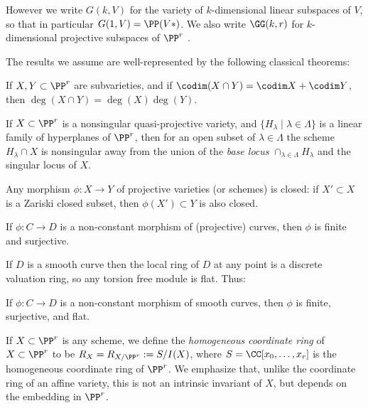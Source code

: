 However we write $G(k,V)$ for the variety of $k$-dimensional linear subspaces of $V$, so that in particular $G(1,V) = \PP(V*)$.
We also write $\GG(k,r)$ for $k$-dimensional
projective subspaces of $\PP^r$ .

The results we assume are
 well-represented by the following classical theorems:

\begin{theorem}
If $X,Y\subset \PP^r$ are subvarieties, and if $\codim(X\cap Y) = \codim X + \codim Y$,
then $\deg (X\cap Y) = \deg(X)\deg(Y)$.
\end{theorem}

\begin{theorem}\label{Bertini}
If $X\subset \PP^r$  is a nonsingular quasi-projective variety, and $\{H_\lambda \mid \lambda\in \Lambda\}$ is a linear family of hyperplanes of $\PP^r$, then for an open subset of $\lambda\in \Lambda$ the scheme $H_\lambda \cap X$ is nonsingular away from the union of the \emph{base locus}
$
\cap_{\lambda \in \Lambda} H_\lambda
$
and the singular locus of $X$.
\end{theorem}

\begin{theorem}
 Any morphism $\phi: X\to Y$ of projective varieties (or schemes) is closed: if $X'\subset X$ is a Zariski closed subset,
 then $\phi(X') \subset Y$ is also closed.
\end{theorem}

\begin{corollary}
If $\phi: C\to D$ is a non-constant morphism of (projective) curves, then $\phi$ is finite and surjective. 
\end{corollary}

If $D$ is a 
smooth curve then the local ring of $D$ at any point is a discrete valuation ring, so any torsion free module is flat. 
Thus:

\begin{proposition}
If $\phi: C\to D$ is a non-constant morphism of smooth curves, then $\phi$ is finite, surjective, and flat.
\end{proposition}

If $X\subset \PP^{r}$ is any scheme, we define the \emph{homogeneous coordinate ring} of $X\subset \PP^{r}$
to be $R_{X} = R_{X/\PP^{r}}:= S/I(X)$, where $S =\CC[x_{0}, \dots, x_{r}]$ is the homogeneous coordinate ring of $\PP^{r}$. We emphasize
that, unlike the coordinate ring of an affine variety, this is not an intrinsic invariant of $X$, but depends on the 
embedding in $\PP^{r}$. 

